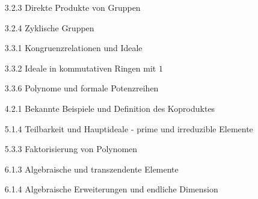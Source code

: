\begin{itemize}
  \item
  [3.2.3]
  Direkte Produkte von Gruppen

  \item
  [3.2.4]
  Zyklische Gruppen

  \item
  [3.3.1]
  Kongruenzrelationen und Ideale

  \item
  [3.3.2]
  Ideale in kommutativen Ringen mit $1$

  \item
  [3.3.6]
  Polynome und formale Potenzreihen

  \item
  [4.2.1]
  Bekannte Beispiele und Definition des Koproduktes

  \item
  [5.1.4]
  Teilbarkeit und Hauptideale - prime und irreduzible Elemente

  \item
  [5.3.3]
  Faktorisierung von Polynomen

  \item
  [6.1.3]
  Algebraische und transzendente Elemente

  \item
  [6.1.4]
  Algebraische Erweiterungen und endliche Dimension

\end{itemize}

